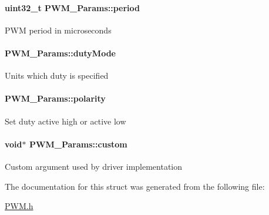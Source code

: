 \paragraph[{period}]{\setlength{\rightskip}{0pt plus 5cm}uint32\-\_\-t P\-W\-M\-\_\-\-Params\-::period}\label{struct_p_w_m___params_a6c88aaea599f9584db7b56fb2b1045f7}
P\-W\-M period in microseconds 
\paragraph[{duty\-Mode}]{ P\-W\-M\-\_\-\-Params\-::duty\-Mode}\label{struct_p_w_m___params_ab054d20d938b0a6a2c93e1470aa42d15}
Units which duty is specified 
\paragraph[{polarity}]{ P\-W\-M\-\_\-\-Params\-::polarity}\label{struct_p_w_m___params_ab8a3786f6ac3ca5306b9c57ba6fccede}
Set duty active high or active low 
\paragraph[{custom}]{\setlength{\rightskip}{0pt plus 5cm}void$\ast$ P\-W\-M\-\_\-\-Params\-::custom}\label{struct_p_w_m___params_a37396e0fa9aac45d2a8292cf5d653471}
Custom argument used by driver implementation 

The documentation for this struct was generated from the following file\-:\begin{DoxyCompactItemize}
\item 
\hyperlink{_p_w_m_8h}{P\-W\-M.\-h}\end{DoxyCompactItemize}
